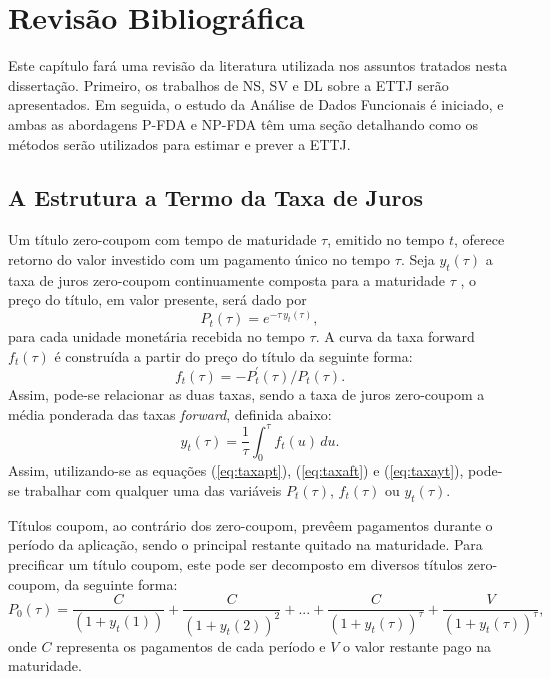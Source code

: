 \documentclass[
	12pt,				%
	openright,			%
	oneside,			%
	a4paper,			%
	english,			%
	brazil				%
	]{dissertacao-ufrgs-abntex2}
\begin{document}
\chapter{Revisão Bibliográfica}

Este capítulo fará uma revisão da literatura utilizada nos assuntos tratados nesta dissertação. Primeiro, os trabalhos de NS, SV e DL sobre a ETTJ serão apresentados. Em seguida, o estudo da Análise de Dados Funcionais é iniciado, e ambas as abordagens P-FDA e NP-FDA têm uma seção detalhando como os métodos serão utilizados para estimar e prever a ETTJ. 

\section{A Estrutura a Termo da Taxa de Juros}

Um título zero-coupom com tempo de maturidade $\tau$, emitido no tempo $t$, oferece retorno do valor investido com um pagamento único no tempo $\tau$. Seja $y_{t}(\tau)$ a taxa de juros zero-coupom continuamente composta para a maturidade $\tau$ , o preço do título, em valor presente, será dado por
\begin{equation}
P_{t}(\tau)=e^{-\tau\, y_{t}(\tau)},\label{eq:taxapt}
\end{equation}
para cada unidade monetária recebida no tempo $\tau$. A curva da
taxa forward $f_{t}(\tau)$ é construída a partir do preço do título
da seguinte forma:
\begin{equation}
f_{t}(\tau)=-P_{t}^{\prime}(\tau)/P_{t}(\tau).\label{eq:taxaft}
\end{equation}
Assim, pode-se relacionar as duas taxas, sendo a taxa de juros zero-coupom
a média ponderada das taxas \emph{forward}, definida abaixo:
\begin{equation}
y_{t}(\tau)=\frac{1}{\tau}\int_{0}^{\tau}f_{t}(u)\, du.\label{eq:taxayt}
\end{equation}
Assim, utilizando-se as equações (\ref{eq:taxapt}), (\ref{eq:taxaft})
e (\ref{eq:taxayt}), pode-se trabalhar com qualquer uma das variáveis
$P_{t}(\tau)$,\foreignlanguage{english}{ $f_{t}(\tau)$} ou $y_{t}(\tau)$.

Títulos coupom, ao contrário dos zero-coupom, prevêem pagamentos durante o período da aplicação, sendo o principal restante quitado na maturidade. Para precificar um título coupom, este pode ser decomposto em diversos títulos zero-coupom, da seguinte forma:
\[
P_{0}(\tau)=\frac{C}{(1+y_{t}(1))}+\frac{C}{(1+y_{t}(2))^{2}}+...+\frac{C}{(1+y_{t}(\tau))^{\tau}}+\frac{V}{(1+y_{t}(\tau))^{\tau}},
\]
onde $C$ representa os pagamentos de cada período e $V$ o valor
restante pago na maturidade.
\end{document}
